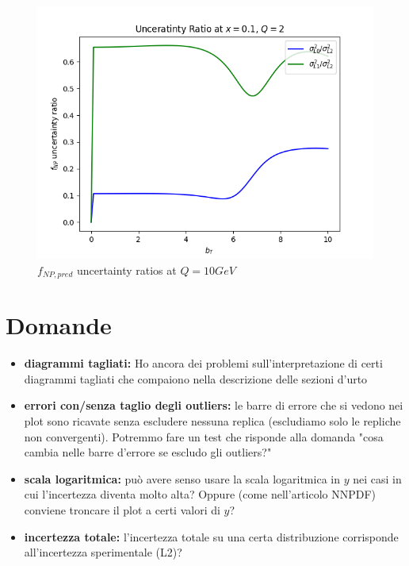 \documentclass{article}
\begin{document}
\begin{itemize}
\begin{figure}[H]
\begin{minipage}{0.45\textwidth}
        \includegraphics[width=\textwidth]{Images/unc_ratios/unc_ratio_f_NP_Q_2_x_0.1.png}
        \caption{$x=0.1$}
    \end{minipage}
    \caption{$f_{NP, pred}$ uncertainty ratios at $Q = 10 GeV$}
    \end{figure}
\end{itemize}

\section{Domande}
\begin{itemize}
    \item \textbf{diagrammi tagliati:} Ho ancora dei problemi sull'interpretazione di certi diagrammi tagliati che compaiono nella descrizione delle sezioni d'urto

    \item \textbf{errori con/senza taglio degli outliers:} le barre di errore che si vedono nei plot sono ricavate senza escludere nessuna replica (escludiamo solo le repliche non convergenti). Potremmo fare un test che risponde alla domanda "cosa cambia nelle barre d'errore se escludo gli outliers?"

    \item \textbf{scala logaritmica:} può avere senso usare la scala logaritmica in $y$ nei casi in cui l'incertezza diventa molto alta? Oppure (come nell'articolo NNPDF) conviene troncare il plot a certi valori di $y$? 

    \item \textbf{incertezza totale:} l'incertezza totale su una certa distribuzione corrisponde all'incertezza sperimentale (L2)?
\end{itemize}
\end{document}
